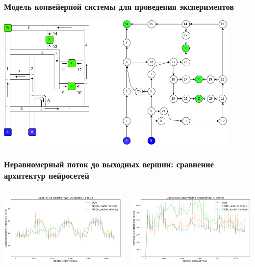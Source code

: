 \documentclass{beamer}
\begin{document}
\begin{frame}
  \frametitle{Модель конвейерной системы для проведения экспериментов}
  \begin{center}
    \includegraphics[width=0.9\textwidth]{test-conveyors} 
  \end{center}
\end{frame}


\begin{frame}
  \frametitle{Неравномерный поток до выходных вершин: сравнение архитектур нейросетей}
  \begin{columns}
    \begin{column}{0.5\textwidth}
      \includegraphics[width=\textwidth]{experiment-conveyors-en1-time-nns}
    \end{column}
    \begin{column}{0.5\textwidth}
      \includegraphics[width=\textwidth]{experiment-conveyors-en1-energy-nns}
    \end{column}
  \end{columns}
\end{frame}
\end{document}
